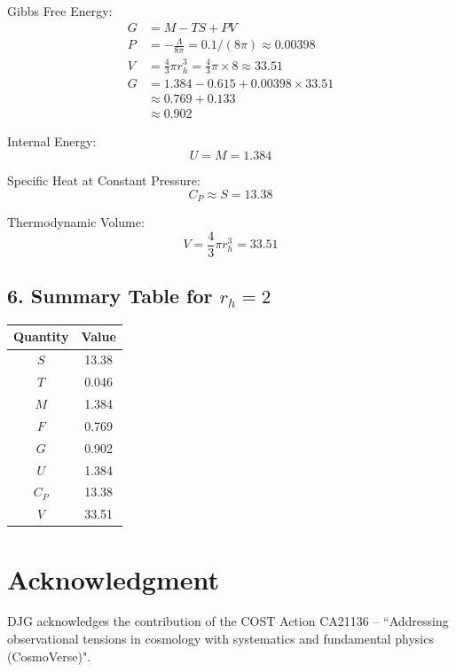\documentclass[superscriptaddress, prd, aps,amsmath,amssymb,showpacs,showkeys, onecolumn]{revtex4-2}
\begin{document}
Gibbs Free Energy:
\begin{align*}
G &= M - T S + P V \\
P &= -\frac{\Lambda}{8\pi} = 0.1/(8\pi) \approx 0.00398 \\
V &= \frac{4}{3}\pi r_h^3 = \frac{4}{3}\pi \times 8 \approx 33.51 \\
G &= 1.384 - 0.615 + 0.00398 \times 33.51 \\
  &\approx 0.769 + 0.133 \\
  &\approx 0.902
\end{align*}

Internal Energy:
\begin{equation}
U = M = 1.384
\end{equation}

Specific Heat at Constant Pressure:
\begin{equation}
C_P \approx S = 13.38
\end{equation}

Thermodynamic Volume:
\begin{equation}
V = \frac{4}{3}\pi r_h^3 = 33.51
\end{equation}

\subsection*{6. Summary Table for $r_h = 2$}
\begin{center}
\begin{tabular}{|c|c|}
\hline
Quantity & Value \\
\hline
$S$ & 13.38 \\
$T$ & 0.046 \\
$M$ & 1.384 \\
$F$ & 0.769 \\
$G$ & 0.902 \\
$U$ & 1.384 \\
$C_P$ & 13.38 \\
$V$ & 33.51 \\
\hline
\end{tabular}
\end{center}


\section*{Acknowledgment}
 DJG acknowledges the contribution of the COST Action CA21136  -- ``Addressing observational tensions in cosmology with systematics and fundamental physics (CosmoVerse)". 
\end{document}
